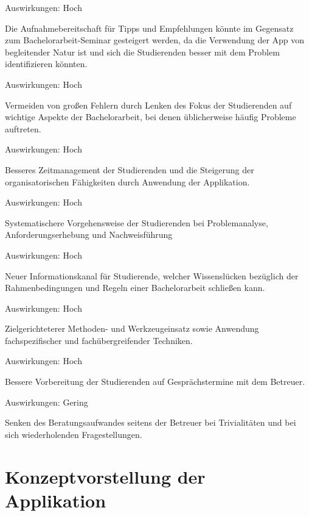 \documentclass[bibliography=totoc,listof=totoc,BCOR=5mm,DIV=12,oneside]{scrbook}
\begin{document}
\begin{enumerate} [label=\textit{[C\arabic*]}]
\item 
\par Auswirkungen: Hoch
\par Die Aufnahmebereitschaft für Tipps und Empfehlungen könnte im Gegensatz zum Bachelorarbeit-Seminar gesteigert werden, da die Verwendung der App von begleitender Natur ist und sich die Studierenden besser mit dem Problem identifizieren könnten.
\item
\par Auswirkungen: Hoch
\par Vermeiden von großen Fehlern durch Lenken des Fokus der Studierenden auf wichtige Aspekte der Bachelorarbeit, bei denen üblicherweise häufig Probleme auftreten.
\item
\par Auswirkungen: Hoch
\par Besseres Zeitmanagement der Studierenden und die Steigerung der organisatorischen Fähigkeiten durch Anwendung der Applikation.
\item
\par Auswirkungen: Hoch
\par Systematischere Vorgehensweise der Studierenden bei Problemanalyse, Anforderungserhebung und Nachweisführung
\item
\par Auswirkungen: Hoch
\par Neuer Informationskanal für Studierende, welcher Wissenslücken bezüglich der Rahmenbedingungen und Regeln einer Bachelorarbeit schließen kann.
\item
\par Auswirkungen: Hoch
\par Zielgerichteterer Methoden- und Werkzeugeinsatz sowie Anwendung fachspezifischer und fachübergreifender Techniken.
\item
\par Auswirkungen: Hoch
\par Bessere Vorbereitung der Studierenden auf Gesprächstermine mit dem Betreuer.
\item 
\par Auswirkungen: Gering
\par Senken des Beratungsaufwandes seitens der Betreuer bei Trivialitäten und bei sich wiederholenden Fragestellungen.
\end{enumerate}

\newpage
\chapter{Konzeptvorstellung der Applikation} \label{chap:konzept}
\end{document}
